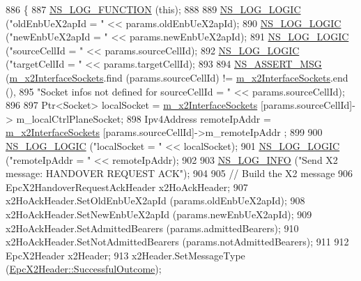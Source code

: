 \begin{DoxyCode}
886 \{
887   \hyperlink{log-macros-disabled_8h_a90b90d5bad1f39cb1b64923ea94c0761}{NS\_LOG\_FUNCTION} (\textcolor{keyword}{this});
888 
889   \hyperlink{group__logging_ga88acd260151caf2db9c0fc84997f45ce}{NS\_LOG\_LOGIC} (\textcolor{stringliteral}{"oldEnbUeX2apId = "} << params.oldEnbUeX2apId);
890   \hyperlink{group__logging_ga88acd260151caf2db9c0fc84997f45ce}{NS\_LOG\_LOGIC} (\textcolor{stringliteral}{"newEnbUeX2apId = "} << params.newEnbUeX2apId);
891   \hyperlink{group__logging_ga88acd260151caf2db9c0fc84997f45ce}{NS\_LOG\_LOGIC} (\textcolor{stringliteral}{"sourceCellId = "} << params.sourceCellId);
892   \hyperlink{group__logging_ga88acd260151caf2db9c0fc84997f45ce}{NS\_LOG\_LOGIC} (\textcolor{stringliteral}{"targetCellId = "} << params.targetCellId);
893 
894   \hyperlink{assert_8h_aff5ece9066c74e681e74999856f08539}{NS\_ASSERT\_MSG} (\hyperlink{classns3_1_1EpcX2_a0665276228b9b99a52ef6d5e9bdb306d}{m\_x2InterfaceSockets}.find (params.sourceCellId) != 
      \hyperlink{classns3_1_1EpcX2_a0665276228b9b99a52ef6d5e9bdb306d}{m\_x2InterfaceSockets}.end (),
895                  \textcolor{stringliteral}{"Socket infos not defined for sourceCellId = "} << params.sourceCellId);
896 
897   Ptr<Socket> localSocket = \hyperlink{classns3_1_1EpcX2_a0665276228b9b99a52ef6d5e9bdb306d}{m\_x2InterfaceSockets} [params.sourceCellId]->
      m\_localCtrlPlaneSocket;
898   Ipv4Address remoteIpAddr = \hyperlink{classns3_1_1EpcX2_a0665276228b9b99a52ef6d5e9bdb306d}{m\_x2InterfaceSockets} [params.sourceCellId]->m\_remoteIpAddr
      ;
899 
900   \hyperlink{group__logging_ga88acd260151caf2db9c0fc84997f45ce}{NS\_LOG\_LOGIC} (\textcolor{stringliteral}{"localSocket = "} << localSocket);
901   \hyperlink{group__logging_ga88acd260151caf2db9c0fc84997f45ce}{NS\_LOG\_LOGIC} (\textcolor{stringliteral}{"remoteIpAddr = "} << remoteIpAddr);
902 
903   \hyperlink{group__logging_gafbd73ee2cf9f26b319f49086d8e860fb}{NS\_LOG\_INFO} (\textcolor{stringliteral}{"Send X2 message: HANDOVER REQUEST ACK"});
904 
905   \textcolor{comment}{// Build the X2 message}
906   EpcX2HandoverRequestAckHeader x2HoAckHeader;
907   x2HoAckHeader.SetOldEnbUeX2apId (params.oldEnbUeX2apId);
908   x2HoAckHeader.SetNewEnbUeX2apId (params.newEnbUeX2apId);
909   x2HoAckHeader.SetAdmittedBearers (params.admittedBearers);
910   x2HoAckHeader.SetNotAdmittedBearers (params.notAdmittedBearers);
911 
912   EpcX2Header x2Header;
913   x2Header.SetMessageType (\hyperlink{classns3_1_1EpcX2Header_a0e69b043a20eaee4c570f223f4eca715a21bd7a420a07fd4849d7271a5c381a44}{EpcX2Header::SuccessfulOutcome});

\end{DoxyCode}
